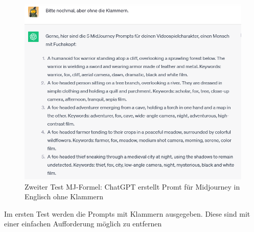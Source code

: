 \documentclass[12pt,a4paper,bibliography=totocnumbered,listof=totocnumbered]{scrartcl}
\begin{document}
\begin{figure}[h]
	\centering
	\includegraphics[scale=0.7]{BilderFuerBA/CGPTMidJourneyMartinLuther/06.png}
	\caption{Zweiter Test MJ-Formel: ChatGPT erstellt Promt für Midjourney in Englisch ohne Klammern}
	\label{fig:chatgpt-ptompt-Midjourney-06}
\end{figure}
Im ersten Test werden die Prompts mit Klammern ausgegeben. Diese sind mit einer einfachen Aufforderung möglich zu entfernen
\end{document}
